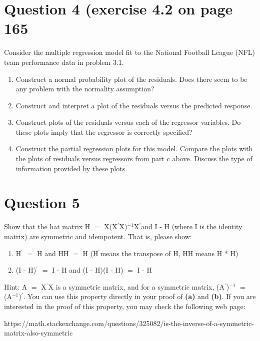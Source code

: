 \documentclass{article}
\newcommand{\mt}[1]{\ensuremath{#1}}
\newcommand\bsc[2][\DefaultOpt]{%
  \def\DefaultOpt{#2}%
  \section[#1]{#2}%
}
\newcommand{\balist}{\begin{enumerate}[label=\alph*.]}
\newcommand{\elist}{\end{enumerate}}
\newcommand{\bpth}[1]{\textbf{(#1)}}
\newcommand{\ms}{\mt{\operatorname{-}} }
\newcommand{\eql}{ \mt{\operatorname{=}} }
\newcommand{\pr}{\mt{^\prime}} 		   %
\newcommand{\uf}[2]{#1\mt{^{#2}}}
\begin{document}
\bsc{Question 4 (exercise 4.2 on page 165}{
Consider the multiple regression model fit to the National Football League (NFL) team performance data in problem 3.1.

\balist
\item Construct a normal probability plot of the residuals. Does there seem to be any problem with the normality assumption?
\item Construct and interpret a plot of the residuals versus the predicted response.
\item Construct plots of the residuals versus each of the regressor variables. Do these plots imply that the regressor is correctly specified?
\item Construct the partial regression plots for this model. Compare the plots with the plots of residuals versus regressors from part c above. Discuss the type of information provided by these plots.
\elist
}

\bsc{Question 5}{
Show that the hat matrix H \eql X\uf{(X\pr X)}{-1}X\pr and I \ms H (where I is the identity matrix) are symmetric and idempotent. That is, please show:
\balist
\item H\pr \eql H and HH \eql H (H\pr means the transpose of H, HH means H * H)
\item (I \ms H)\pr \eql I \ms H and (I \ms H)(I \ms H) \eql I \ms H
\elist

Hint: A\eql X\pr X is a symmetric matrix, and for a symmetric matrix, \uf{(A\pr)}{-1} \eql (\uf{A}{-1})\pr. You can use this property directly in your proof of \bpth{a} and \bpth{b}. If you are interested in the proof of this property, you may check the following web page:

https://math.stackexchange.com/questions/325082/is-the-inverse-of-a-symmetric-matrix-also-symmetric

}
\end{document}
